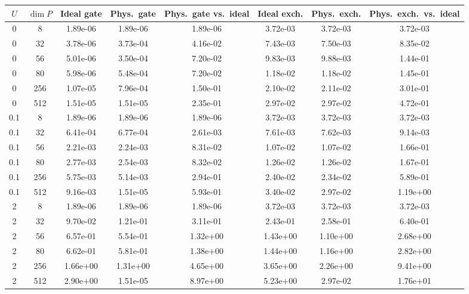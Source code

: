\begin{tabular}{cccccccc}
\hline
$U$ & $\dim P$ & Ideal gate & Phys.\ gate & Phys.\ gate vs.\ ideal & Ideal exch. & Phys.\ exch. & Phys.\ exch.\ vs.\ ideal \\
\hline
0 & 8 & 1.89e-06 & 1.89e-06 & 1.89e-06 & 3.72e-03 & 3.72e-03 & 3.72e-03 \\
0 & 32 & 3.78e-06 & 3.73e-04 & 4.16e-02 & 7.43e-03 & 7.50e-03 & 8.35e-02 \\
0 & 56 & 5.01e-06 & 3.50e-04 & 7.20e-02 & 9.83e-03 & 9.88e-03 & 1.44e-01 \\
0 & 80 & 5.98e-06 & 5.48e-04 & 7.20e-02 & 1.18e-02 & 1.18e-02 & 1.45e-01 \\
0 & 256 & 1.07e-05 & 7.96e-04 & 1.50e-01 & 2.10e-02 & 2.11e-02 & 3.01e-01 \\
0 & 512 & 1.51e-05 & 1.51e-05 & 2.35e-01 & 2.97e-02 & 2.97e-02 & 4.72e-01 \\
\hline
0.1 & 8 & 1.89e-06 & 1.89e-06 & 1.89e-06 & 3.72e-03 & 3.72e-03 & 3.72e-03 \\
0.1 & 32 & 6.41e-04 & 6.77e-04 & 2.61e-03 & 7.61e-03 & 7.62e-03 & 9.14e-03 \\
0.1 & 56 & 2.21e-03 & 2.24e-03 & 8.31e-02 & 1.07e-02 & 1.07e-02 & 1.66e-01 \\
0.1 & 80 & 2.77e-03 & 2.54e-03 & 8.32e-02 & 1.26e-02 & 1.26e-02 & 1.67e-01 \\
0.1 & 256 & 5.75e-03 & 5.14e-03 & 2.94e-01 & 2.40e-02 & 2.34e-02 & 5.89e-01 \\
0.1 & 512 & 9.16e-03 & 1.51e-05 & 5.93e-01 & 3.40e-02 & 2.97e-02 & 1.19e+00 \\
\hline
2 & 8 & 1.89e-06 & 1.89e-06 & 1.89e-06 & 3.72e-03 & 3.72e-03 & 3.72e-03 \\
2 & 32 & 9.70e-02 & 1.21e-01 & 3.11e-01 & 2.43e-01 & 2.58e-01 & 6.40e-01 \\
2 & 56 & 6.57e-01 & 5.54e-01 & 1.32e+00 & 1.43e+00 & 1.10e+00 & 2.68e+00 \\
2 & 80 & 6.62e-01 & 5.81e-01 & 1.38e+00 & 1.44e+00 & 1.16e+00 & 2.82e+00 \\
2 & 256 & 1.66e+00 & 1.31e+00 & 4.65e+00 & 3.65e+00 & 2.26e+00 & 9.41e+00 \\
2 & 512 & 2.90e+00 & 1.51e-05 & 8.97e+00 & 5.23e+00 & 2.97e-02 & 1.76e+01 \\
\hline
\end{tabular}
